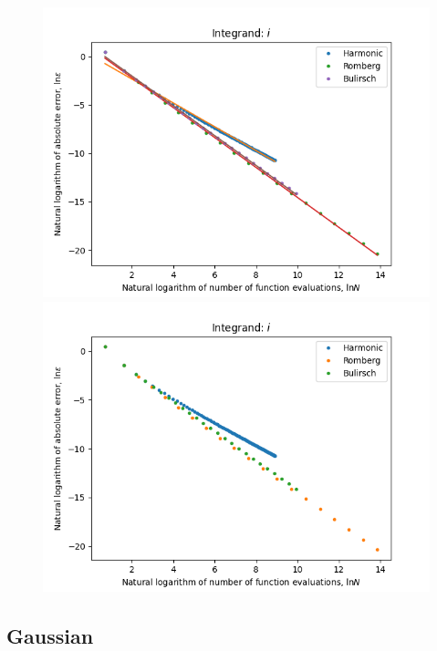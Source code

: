 \begin{figure}[H]
\centering
\begin{minipage}{0.45\textwidth}
\centering
\includegraphics[scale=0.45]{../results/romberg_plots/circle_area_hp_log_log_trend.png}
\end{minipage}
\begin{minipage}{0.45\textwidth}
\centering
\includegraphics[scale=0.45]{../results/romberg_plots/circle_area_hp_log_log.png}
\end{minipage}
\end{figure}

\subsection{Gaussian}

